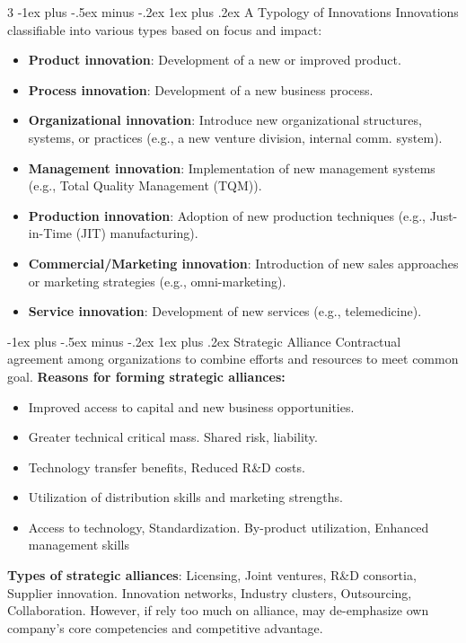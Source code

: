\documentclass[10pt, landscape]{article}
\makeatletter
\renewcommand{\subsubsection}{\@startsection{subsubsection}{3}{0mm}%
                                {-1ex plus -.5ex minus -.2ex}%
                                {1ex plus .2ex}%
                                {\normalfont\small\bfseries}}
\makeatother
\begin{document}
\begin{multicols*}{3}
\subsubsection{A Typology of Innovations}
Innovations classifiable into various types based on focus and impact:
\begin{itemize}[itemsep=-2pt]
    \item \textbf{Product innovation}: Development of a new or improved product.
    \item \textbf{Process innovation}: Development of a new business process.
    \item \textbf{Organizational innovation}: Introduce new organizational structures, systems, or practices (e.g., a new venture division, internal comm. system).
    \item \textbf{Management innovation}: Implementation of new management systems (e.g., Total Quality Management (TQM)).
    \item \textbf{Production innovation}: Adoption of new production techniques (e.g., Just-in-Time (JIT) manufacturing).
    \item \textbf{Commercial/Marketing innovation}: Introduction of new sales approaches or marketing strategies (e.g., omni-marketing).
    \item \textbf{Service innovation}: Development of new services (e.g., telemedicine).
\end{itemize}

\subsubsection{Strategic Alliance}
Contractual agreement among organizations to combine efforts and resources to meet common goal. \textbf{Reasons for forming strategic alliances:}
    \begin{itemize}[itemsep=-2pt]
        \item Improved access to capital and new business opportunities.
        \item Greater technical critical mass. Shared risk, liability.
        \item Technology transfer benefits, Reduced R\&D costs.
        \item Utilization of distribution skills and marketing strengths.
        \item Access to technology, Standardization. By-product utilization, Enhanced management skills
    \end{itemize}
\textbf{Types of strategic alliances}: Licensing, Joint ventures, R\&D consortia, Supplier innovation. Innovation networks, Industry clusters, Outsourcing, Collaboration. However, if rely too much on alliance, may de-emphasize own company's core competencies and competitive advantage.



\end{multicols*}
\end{document}
